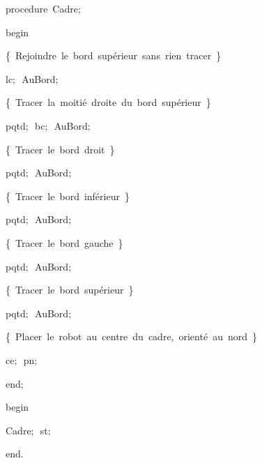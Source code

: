 {\pagebreak[3] 
\vspace{\neglskip}\mbox{\blc  \blk\idt  \mcl procedure\idt \ Cadre$;$}\par 
\vspace{\neglskip}\mbox{\blc  \blk\idt  \mcl begin\idt }\par 
\vspace{\neglskip}\mbox{\blc  \blk\blk\idt  \cmt  \{\ Rejoindre\ le\ bord\ supérieur\ sans\ rien\ tracer\ \}\idt }\par 
\vspace{\neglskip}\mbox{\blc  \blk\blk\idt  lc$;$\ AuBord$;$}\par 
\vspace{\neglskip}\mbox{\blc  \blk\blk\idt  \cmt  \{\ Tracer\ la\ moitié\ droite\ du\ bord\ supérieur\ \}\idt }\par 
\vspace{\neglskip}\mbox{\blc  \blk\blk\idt  pqtd$;$\ bc$;$\ AuBord$;$}\par 
\vspace{\neglskip}\mbox{\blc  \blk\blk\idt  \cmt  \{\ Tracer\ le\ bord\ droit\ \}\idt }\par 
\vspace{\neglskip}\mbox{\blc  \blk\blk\idt  pqtd$;$\ AuBord$;$}\par 
\vspace{\neglskip}\mbox{\blc  \blk\blk\idt  \cmt  \{\ Tracer\ le\ bord\ inférieur\ \}\idt }\par 
\vspace{\neglskip}\mbox{\blc  \blk\blk\idt  pqtd$;$\ AuBord$;$}\par 
\vspace{\neglskip}\mbox{\blc  \blk\blk\idt  \cmt  \{\ Tracer\ le\ bord\ gauche\ \}\idt }\par 
\vspace{\neglskip}\mbox{\blc  \blk\blk\idt  pqtd$;$\ AuBord$;$}\par 
\vspace{\neglskip}\mbox{\blc  \blk\blk\idt  \cmt  \{\ Tracer\ le\ bord\ supérieur\ \}\idt }\par 
\vspace{\neglskip}\mbox{\blc  \blk\blk\idt  pqtd$;$\ AuBord$;$}\par 
\vspace{\neglskip}\mbox{\blc  \blk\blk\idt  \cmt  \{\ Placer\ le\ robot\ au\ centre\ du\ cadre,\ orienté\ au\ nord\ \}\idt }\par 
\vspace{\neglskip}\mbox{\blc  \blk\blk\idt  ce$;$\ pn$;$}\par 
\vspace{\neglskip}\mbox{\blc  \blk\idt  \mcl end\idt $;$}\par 
\medskip

\vspace{\neglskip}\mbox{\blc  \idt  \mcl begin\idt }\par 
\vspace{\neglskip}\mbox{\blc  \blk\idt  Cadre$;$\ st$;$}\par 
\vspace{\neglskip}\mbox{\blc  \idt  \mcl end\idt $.$}\par 

\medskip }

